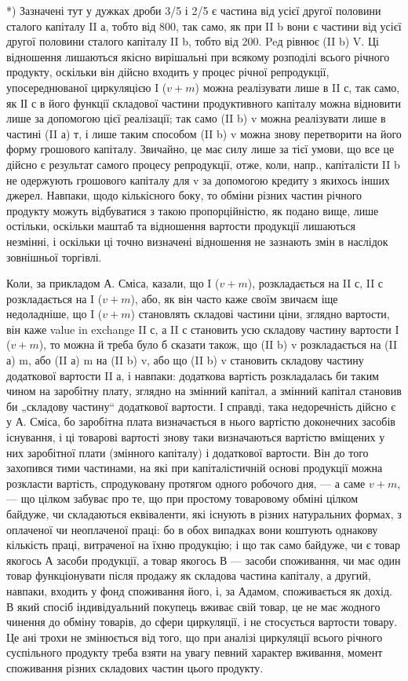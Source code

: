 *) Зазначені тут у дужках дроби 3/5 і 2/5 є частина від усієї другої половини
сталого капіталу II а, тобто від 800, так само, як при II b вони є частини від усієї
другої половини сталого капіталу II b, тобто від 200. Peд
рівнює (II b) V. Ці відношення лишаються якісно вирішальні при всякому
розподілі всього річного продукту, оскільки він дійсно входить у процес
річної репродукції, упосереднюваної циркуляцією I ($v + m$) можна реалізувати
лише в II с, так само, як ІІ с в його функції складової частини
продуктивного капіталу можна відновити лише за допомогою цієї реалізації;
так само (II b) v можна реалізувати лише в частині (II а) т, і лише
таким способом (II b) v можна знову перетворити на його форму грошового
капіталу. Звичайно, це має силу лише за тієї умови, що все це дійсно
є результат самого процесу репродукції, отже, коли, напр., капіталісти
II b не одержують грошового капіталу для v за допомогою кредиту з
якихось інших джерел. Навпаки, щодо кількісного боку, то обміни різних
частин річного продукту можуть відбуватися з такою пропорційністю, як
подано вище, лише остільки, оскільки маштаб та відношення вартости
продукції лишаються незмінні, і оскільки ці точно визначені відношення
не зазнають змін в наслідок зовнішньої торгівлі.

Коли, за прикладом А. Сміса, казали, що I ($v + m$), розкладається на
II с, II с розкладається на I ($v + m$), або, як він часто каже своїм
звичаєм іще недоладніше, що I ($v + m$) становлять складові частини ціни,
зглядно вартости, він каже value in exchange II с, а II с становить усю
складову частину вартости I ($v + m$), то можна й треба було б сказати
також, що (II b) v розкладається на (II а) m, або (II а) m на (II b) v,
або що (II b) v становить складову частину додаткової вартости II а, і
навпаки: додаткова вартість розкладалась би таким чином на заробітну
плату, зглядно на змінний капітал, а змінний капітал становив би „складову
частину“ додаткової вартости. І справді, така недоречність дійсно
є у А. Сміса, бо заробітна плата визначається в нього вартістю доконечних
засобів існування, і ці товарові вартості знову таки визначаються
вартістю вміщених у них заробітної плати (змінного капіталу) і додаткової
вартости. Він до того захопився тими частинами, на які при капіталістичній
основі продукції можна розкласти вартість, спродуковану протягом
одного робочого дня, — а саме $v + m$, — що цілком забуває про те, що при
простому товаровому обміні цілком байдуже, чи складаються еквіваленти,
які існують в різних натуральних формах, з оплаченої чи неоплаченої праці:
бо в обох випадках вони коштують однакову кількість праці, витраченої
на їхню продукцію; і що так само байдуже, чи є товар якогось А засоби
продукції, а товар якогось В — засоби споживання, чи має один
товар функціонувати після продажу як складова частина капіталу, а
другий, навпаки, входить у фонд споживання його, і, за Адамом, споживається
як дохід. В який спосіб індивідуальний покупець вживає свій
товар, це не має жодного чинення до обміну товарів, до сфери циркуляції,
і не стосується вартости товару. Це ані трохи не змінюється
від того, що при аналізі циркуляції всього річного суспільного продукту
треба взяти на увагу певний характер вживання, момент споживання
різних складових частин цього продукту.

